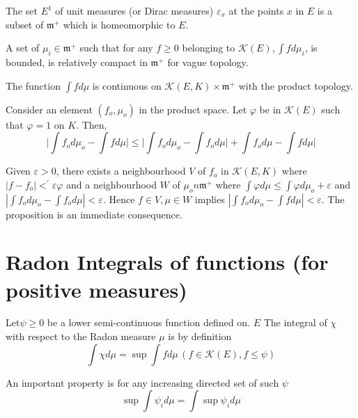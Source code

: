 \setcounter{prop}{0}
\begin{prop}\label{p3:chap1:sec1:prop1}%
  The set $E^1$ of unit measures (or Dirac measures) $\varepsilon _x$
  at the points $x$ in $E$ is a subset of $\mathfrak{m}^{+}$ which is
  homeomorphic to $E$. 
\end{prop}

\begin{prop}[Compactness]\label{p3:chap1:sec1:prop2}%
  A set of $\mu_i \in \mathfrak{m}^{+}$ such that for any $f \ge 0$ belonging to
  $\mathcal{K}(E), \int f d \mu_i$, is bounded, is relatively compact
  in $\mathfrak{m}^{+}$ for vague topology. 
\end{prop}

\begin{prop}\label{p3:chap1:sec1:prop3}%
  The function $\int f d \mu$ is continuous on $\mathcal{K}(E, K)
  \times \mathfrak{m}^{+}$ with the product topology. 
\end{prop}

Consider an element $(f_o, \mu_o)$ in the product space. Let $\varphi$
be in $\mathcal{K}(E)$ such that $\varphi = 1$ on $K$. Then, 
$$
\bigg| \int f_o d \mu_o - \int f d \mu \bigg| \le \bigg| \int f_o d
\mu_o - \int f_o d \mu \bigg| + \int f_o d \mu - \int f d \mu \bigg| 
$$

Given $\varepsilon > 0$, there exists a neighbourhood $V$ of $f_o$ in
$\mathcal{K}(E, K)$ where $|f - f_o | <^{'} \varepsilon \varphi$ and a
neighbourhood $W$ of $\mu_o n \mathfrak{m}^{+}$ where $\int \varphi d \mu \le
\int \varphi  d \mu_o + \varepsilon$ and $|\int f_o d \mu_o - \int
f_o d \mu | < \varepsilon$. Hence $ f \in V, \mu \in W$ implies $|
\int f_o d \mu_o - \int f d \mu | < \varepsilon$. The proposition is
an immediate consequence. 

\section{Radon Integrals of functions (for positive
  measures)}\label{p3:chap1:sec2} %

Let\pageoriginale $\psi \ge 0$ be a lower semi-continuous function defined on. $E$
The integral of $\chi$ with respect to the Radon measure $\mu$ is by
definition 
$$
\int \chi d \mu = \sup \int f d \mu \,(f \in \mathcal{K}(E), f \le \psi) 
$$

An important property is for any increasing directed set of such $\psi$
$$
\sup \int \psi_i d \mu = \int \sup \psi_i d \mu
$$

